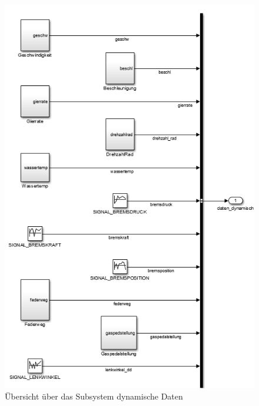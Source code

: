 \documentclass[fontsize = 12pt, paper = a4]{scrreprt}
\begin{document}
\newpage

\begin{figure}[h]
\centering
\includegraphics[scale = 0.85]{dyndaten}
\caption[Subsystem Dynamische Daten]{Übersicht über das Subsystem dynamische Daten}
\label{dyndaten}
\end{figure} 

\newpage
\end{document}
